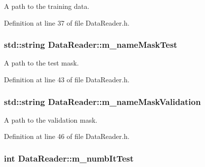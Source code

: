 A path to the training data. 



Definition at line 37 of file Data\+Reader.\+h.

\subsubsection[{\texorpdfstring{m\+\_\+name\+Mask\+Test}{m_nameMaskTest}}]{\setlength{\rightskip}{0pt plus 5cm}std\+::string Data\+Reader\+::m\+\_\+name\+Mask\+Test\hspace{0.3cm}{\ttfamily [private]}}\hypertarget{classDataReader_ad0b4aa478a29fe29c71230d6ba1582ce}{}\label{classDataReader_ad0b4aa478a29fe29c71230d6ba1582ce}


A path to the test mask. 



Definition at line 43 of file Data\+Reader.\+h.

\subsubsection[{\texorpdfstring{m\+\_\+name\+Mask\+Validation}{m_nameMaskValidation}}]{\setlength{\rightskip}{0pt plus 5cm}std\+::string Data\+Reader\+::m\+\_\+name\+Mask\+Validation\hspace{0.3cm}{\ttfamily [private]}}\hypertarget{classDataReader_a5b59718d2007d1bb2f7b502788df8752}{}\label{classDataReader_a5b59718d2007d1bb2f7b502788df8752}


A path to the validation mask. 



Definition at line 46 of file Data\+Reader.\+h.

\subsubsection[{\texorpdfstring{m\+\_\+numb\+It\+Test}{m_numbItTest}}]{\setlength{\rightskip}{0pt plus 5cm}int Data\+Reader\+::m\+\_\+numb\+It\+Test\hspace{0.3cm}{\ttfamily [private]}}\hypertarget{classDataReader_a9a9f00295f7d5aaca78539802fe09c6c}{}\label{classDataReader_a9a9f00295f7d5aaca78539802fe09c6c}


